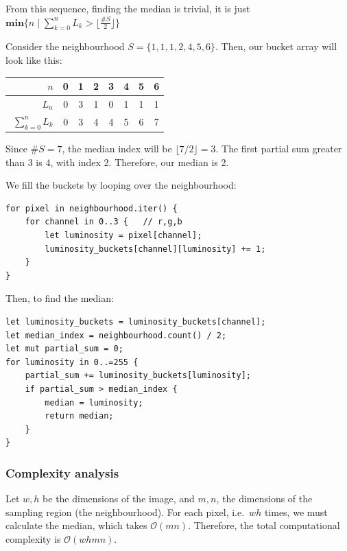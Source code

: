 \documentclass[12pt]{article}
\begin{document}
From this sequence, finding the median is trivial, it is just $\mathbf{min}\big\{n \mid \sum_{k=0}^n L_k > \lfloor \frac{\#S}{2} \rfloor \big\}$

\begin{example}
    Consider the neighbourhood $S = \{1,1,1,2,4,5,6\}$.
    Then, our bucket array will look like this:
    \begin{table}[H]\centering
        \begin{tabular}{|r|c|c|c|c|c|c|c|}
            \hline
            $\phantom{\big|}n$                & 0 & 1 & 2 & 3 & 4 & 5 & 6 \\ \hline
            $\phantom{\big|}L_n$              & 0 & 3 & 1 & 0 & 1 & 1 & 1 \\ \hline\hline
            $\phantom{\Big|}\sum_{k=0}^n L_k$ & 0 & 3 & 4 & 4 & 5 & 6 & 7 \\
            \hline
        \end{tabular}
    \end{table}
    Since $\#S = 7$, the median index will be $\lfloor 7/2 \rfloor = 3$.
    The first partial sum greater than 3 is 4, with index 2. Therefore, our median is 2.
\end{example}

We fill the buckets by looping over the neighbourhood:
\begin{lstlisting}
for pixel in neighbourhood.iter() {
    for channel in 0..3 {   // r,g,b
        let luminosity = pixel[channel];
        luminosity_buckets[channel][luminosity] += 1;
    }
}
\end{lstlisting}

Then, to find the median:
\begin{lstlisting}
let luminosity_buckets = luminosity_buckets[channel];
let median_index = neighbourhood.count() / 2;
let mut partial_sum = 0;
for luminosity in 0..=255 {
    partial_sum += luminosity_buckets[luminosity];
    if partial_sum > median_index {
        median = luminosity;
        return median;
    }
}

\end{lstlisting}


\subsubsection{Complexity analysis}

Let $w,h$ be the dimensions of the image, and $m,n$, the dimensions of the sampling region (the neighbourhood).
For each pixel, i.e.\ $wh$ times, we must calculate the median, which takes $\mathcal{O}(mn)$.
Therefore, the total computational complexity is $\mathcal{O}(whmn)$.
\end{document}
